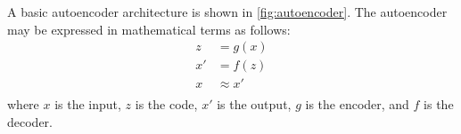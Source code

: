 A basic autoencoder architecture is shown in \ref{fig:autoencoder}. The autoencoder may be expressed in mathematical terms as follows:
%
\begin{equation}\label{eq:autoencoder}
    \begin{split}
        z &= g(x) \\
        x' &= f(z) \\
        x &\approx x' \\
    \end{split}
\end{equation}
%
where $x$ is the input, $z$ is the code, $x'$ is the output, $g$ is the encoder, and $f$ is the decoder.
